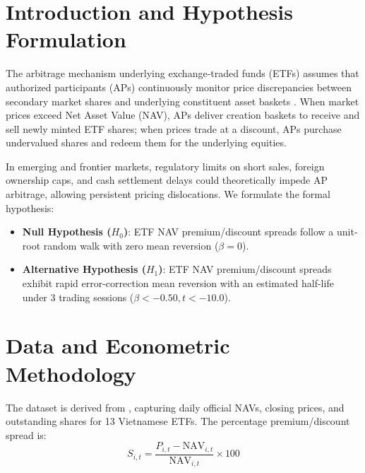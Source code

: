 \documentclass{article}
\begin{document}
\section{Introduction and Hypothesis Formulation}
\label{sec:intro}

The arbitrage mechanism underlying exchange-traded funds (ETFs) assumes that authorized participants (APs) continuously monitor price discrepancies between secondary market shares and underlying constituent asset baskets \citep{malkiel1977closed, petajisto2017inefficiencies, ben2018exchange}. When market prices exceed Net Asset Value (NAV), APs deliver creation baskets to receive and sell newly minted ETF shares; when prices trade at a discount, APs purchase undervalued shares and redeem them for the underlying equities.

In emerging and frontier markets, regulatory limits on short sales, foreign ownership caps, and cash settlement delays could theoretically impede AP arbitrage, allowing persistent pricing dislocations. We formulate the formal hypothesis:
\begin{itemize}
    \item \textbf{Null Hypothesis ($H_0$)}: ETF NAV premium/discount spreads follow a unit-root random walk with zero mean reversion ($\beta = 0$).
    \item \textbf{Alternative Hypothesis ($H_1$)}: ETF NAV premium/discount spreads exhibit rapid error-correction mean reversion with an estimated half-life under 3 trading sessions ($\beta < -0.50, t < -10.0$).
\end{itemize}

\section{Data and Econometric Methodology}
\label{sec:data}

The dataset is derived from , capturing daily official NAVs, closing prices, and outstanding shares for 13 Vietnamese ETFs. The percentage premium/discount spread is:
\begin{equation}
    S_{i,t} = \frac{P_{i,t} - \text{NAV}_{i,t}}{\text{NAV}_{i,t}} \times 100
\end{equation}
\end{document}
